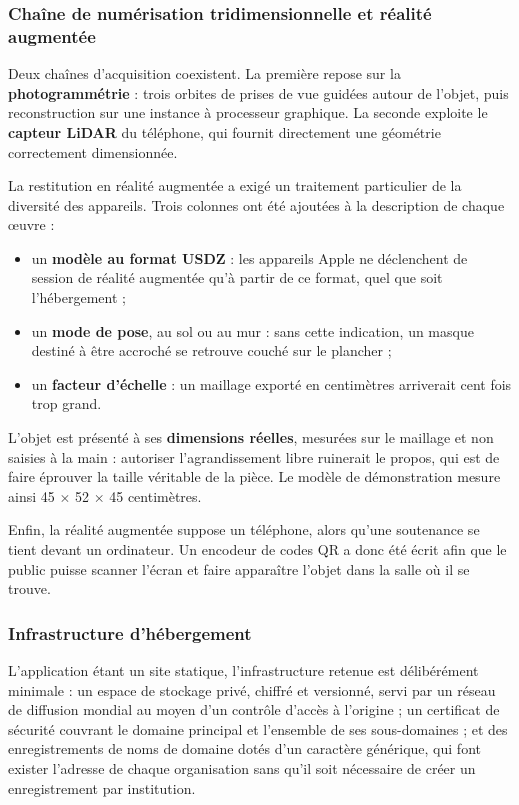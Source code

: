 \subsubsection{Chaîne de numérisation tridimensionnelle et réalité augmentée}

Deux chaînes d'acquisition coexistent. La première repose sur la
\textbf{photogrammétrie} : trois orbites de prises de vue guidées autour de
l'objet, puis reconstruction sur une instance à processeur graphique. La
seconde exploite le \textbf{capteur LiDAR} du téléphone, qui fournit directement
une géométrie correctement dimensionnée.

La restitution en réalité augmentée a exigé un traitement particulier de la
diversité des appareils. Trois colonnes ont été ajoutées à la description de
chaque œuvre :

\begin{itemize}
  \item un \textbf{modèle au format USDZ} : les appareils Apple ne déclenchent
        de session de réalité augmentée qu'à partir de ce format, quel que soit
        l'hébergement ;
  \item un \textbf{mode de pose}, au sol ou au mur : sans cette indication, un
        masque destiné à être accroché se retrouve couché sur le plancher ;
  \item un \textbf{facteur d'échelle} : un maillage exporté en centimètres
        arriverait cent fois trop grand.
\end{itemize}

L'objet est présenté à ses \textbf{dimensions réelles}, mesurées sur le maillage
et non saisies à la main : autoriser l'agrandissement libre ruinerait le propos,
qui est de faire éprouver la taille véritable de la pièce. Le modèle de
démonstration mesure ainsi 45 $\times$ 52 $\times$ 45 centimètres.

Enfin, la réalité augmentée suppose un téléphone, alors qu'une soutenance se
tient devant un ordinateur. Un encodeur de codes QR a donc été écrit afin que le
public puisse scanner l'écran et faire apparaître l'objet dans la salle où il se
trouve.

\subsubsection{Infrastructure d'hébergement}

L'application étant un site statique, l'infrastructure retenue est délibérément
minimale : un espace de stockage privé, chiffré et versionné, servi par un
réseau de diffusion mondial au moyen d'un contrôle d'accès à l'origine ; un
certificat de sécurité couvrant le domaine principal et l'ensemble de ses
sous-domaines ; et des enregistrements de noms de domaine dotés d'un caractère
générique, qui font exister l'adresse de chaque organisation sans qu'il soit
nécessaire de créer un enregistrement par institution.

